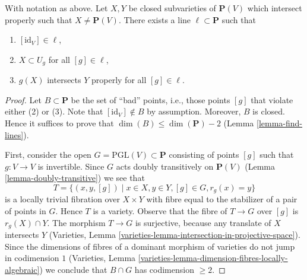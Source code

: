 \begin{lemma}
\label{lemma-make-family}
With notation as above. Let $X, Y$ be closed subvarieties of $\mathbf{P}(V)$
which intersect properly such that $X \not = \mathbf{P}(V)$. There exists
a line $\ell \subset \mathbf{P}$ such that
\begin{enumerate}
\item $[\text{id}_V] \in \ell$,
\item $X \subset U_g$ for all $[g] \in \ell$,
\item $g(X)$ intersects $Y$ properly for all $[g] \in \ell$.
\end{enumerate}
\end{lemma}

\begin{proof}
Let $B \subset \mathbf{P}$ be the set of ``bad'' points, i.e., those
points $[g]$ that violate either (2) or (3). Note that
$[\text{id}_V] \not \in B$ by assumption. Moreover, $B$ is closed.
Hence it suffices to prove that $\dim(B) \leq \dim(\mathbf{P}) - 2$
(Lemma \ref{lemma-find-lines}).

\medskip\noindent
First, consider the open $G = \text{PGL}(V) \subset \mathbf{P}$
consisting of points $[g]$ such that $g : V \to V$ is invertible.
Since $G$ acts doubly transitively on $\mathbf{P}(V)$
(Lemma \ref{lemma-doubly-transitive})
we see that
$$
T = \{(x, y, [g]) \mid x \in X, y \in Y, [g] \in G, r_g(x) = y\}
$$
is a locally trivial fibration over $X \times Y$ with fibre equal
to the stabilizer of a pair of points in $G$. Hence $T$ is a variety.
Observe that the fibre of $T \to G$ over $[g]$ is $r_g(X) \cap Y$.
The morphism $T \to G$ is surjective, because any translate of $X$
intersects $Y$
(Varieties, Lemma \ref{varieties-lemma-intersection-in-projective-space}).
Since the dimensions of fibres of a dominant morphism of varieties do
not jump in codimension $1$
(Varieties, Lemma \ref{varieties-lemma-dimension-fibres-locally-algebraic})
we conclude that $B \cap G$ has codimension $\geq 2$.


\end{proof}

